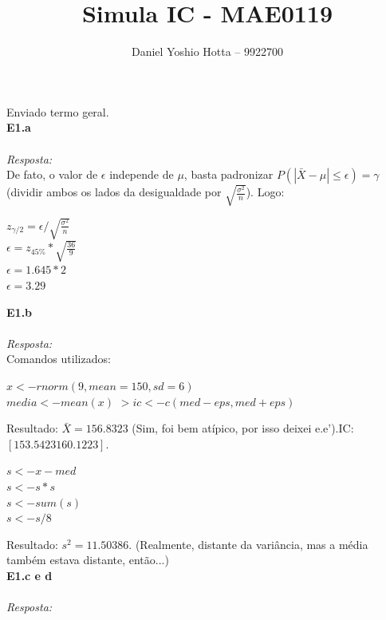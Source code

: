 \documentclass{article}
\begin{document}
	
	\title{Simula IC - MAE0119}
	\author{Daniel Yoshio Hotta – 9922700}
	
	\maketitle	
	
	Enviado termo geral.\\
	
	\textbf {E1.a} 
	\\ \\
	\textit {Resposta:} \\
	
	De fato, o valor de $\epsilon$ independe de $\mu$, basta padronizar $P(|\bar{X} - \mu| \leq \epsilon) = \gamma$ (dividir ambos os lados da desigualdade por $\sqrt{\frac{\sigma^2}{n}}$). Logo:
	
	\begin{center}
		$z_{\gamma/2} = \epsilon / \sqrt{\frac{\sigma^2}{n}}$\\
		$\epsilon = z_{45\%} * \sqrt{\frac{36}{9}}$\\
		$\epsilon = 1.645 * 2$\\
		$\epsilon = 3.29$
    \end{center}
		
	\textbf {E1.b} 
	\\ \\
	\textit {Resposta:} \\	
	
	Comandos utilizados:
	
	\begin{center}
		$x <- rnorm(9, mean = 150, sd = 6)$\\
		$media <- mean (x)$	
		$> ic <- c (med - eps, med + eps)$
	\end{center}
		
	Resultado: $\bar{X} = 156.8323$ (Sim, foi bem atípico, por isso deixei e.e').IC: $[153.5423 160.1223]$.
	
	\begin{center}
		$s <- x - med$\\
		$s <- s * s $\\
		$ s <- sum (s)$\\
		$s <- s / 8$
	\end{center}
		
	Resultado:  $s^2 = 11.50386$. (Realmente, distante da variância, mas a média também estava distante, então...)\\
	
	\textbf {E1.c e d} 
	\\ \\
	\textit {Resposta:} \\	
	
\end{document}
